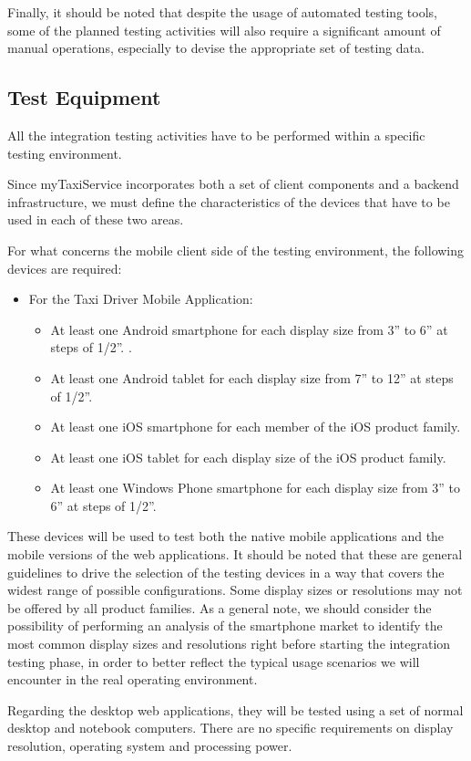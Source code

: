 Finally, it should be noted that despite the usage of automated testing tools, some of the planned testing activities will also require a significant amount of manual operations, especially to devise the appropriate set of testing data.
\subsection{Test Equipment}
All the integration testing activities have to be performed within a specific testing environment. 

Since myTaxiService incorporates both a set of client components and a backend infrastructure, we must define the characteristics of the devices that have to be used in each of these two areas.

For what concerns the mobile client side of the testing environment, the following devices are required:
\begin{itemize}
	\item For the Taxi Driver Mobile Application:
		\begin{itemize}
		\item At least one Android smartphone for each display size from 3” to 6” at steps of 1/2”. .
		\item At least one Android tablet for each display size from 7” to 12” at steps of 1/2”. 
		\item At least one iOS smartphone for each member of the iOS product family.
		\item At least one iOS tablet for each display size of the iOS product family.
		\item At least one Windows Phone smartphone for each display size from 3” to 6” at steps of 1/2”. 
		\end{itemize}
\end{itemize}
These devices will be used to test both the native mobile applications and the mobile versions of the web applications.
It should be noted that these are general guidelines to drive the selection of the testing devices in a way that covers the widest range of possible configurations. Some display sizes or resolutions may not be offered by all product families. 
As a general note, we should consider the possibility of performing an analysis of the smartphone market to identify the most common display sizes and resolutions right before starting the integration testing phase, in order to better reflect the typical usage scenarios we will encounter in the real operating environment. 

Regarding the desktop web applications, they will be tested using a set of normal desktop and notebook computers. There are no specific requirements on display resolution, operating system and processing power.

